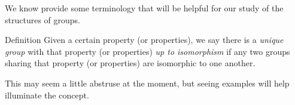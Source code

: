 \bigskip
{}


We know provide some terminology that will be helpful for our study of the structures of groups.

\begin{df}{Definition} Given a certain property (or properties), we say there
is a \textit{unique group} with that property (or properties) \textit{up to isomorphism} if any two groups sharing that property (or
properties) are isomorphic to one another.\end{df}

This may seem a little abstruse at the moment, but seeing examples will help illuminate the concept.

